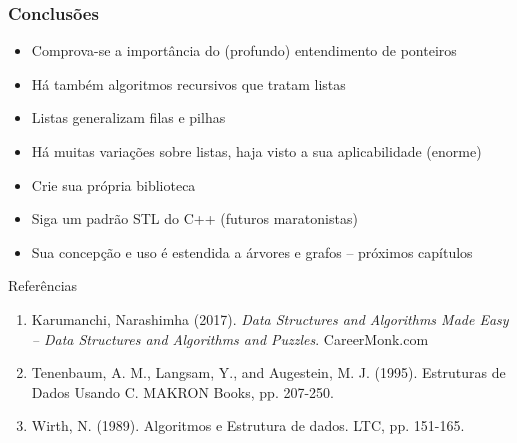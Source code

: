 \begin{frame}%

\frametitle{Conclusões}

\begin{block}{}

\begin{itemize}
  \item Comprova-se a importância do (profundo) entendimento de ponteiros
  \item Há também algoritmos recursivos que tratam listas 
  \item Listas generalizam filas e pilhas
  \item Há muitas variações sobre listas, haja visto a sua aplicabilidade (enorme)

  \item Crie sua própria biblioteca
  \item Siga um padrão STL do C++ (futuros maratonistas)
  \item Sua concepção e uso é estendida a árvores e grafos -- próximos capítulos
   
  
\end{itemize}
\end{block}
\end{frame} 





\begin{frame}{Referências}
	\begin{enumerate}
	\item Karumanchi, Narashimha (2017). 
	\textit{Data Structures and Algorithms Made Easy -- Data Structures and Algorithms
		and Puzzles}.  CareerMonk.com

\item Tenenbaum, A. M., Langsam, Y., and Augestein, M. J. (1995). Estruturas de Dados Usando C. MAKRON Books, pp. 207-250.
\item Wirth, N. (1989). Algoritmos e Estrutura de dados. LTC, pp. 151-165.
	\end{enumerate}
\end{frame}
